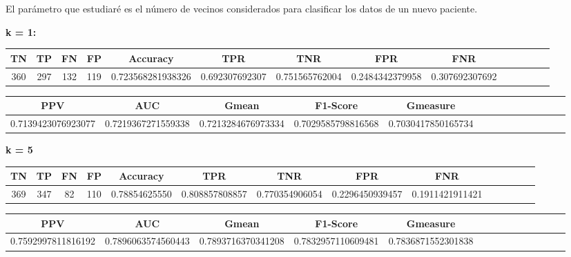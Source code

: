 \documentclass[a4]{article}
\begin{document}
El parámetro que estudiaré es el número de vecinos considerados para clasificar los datos de un nuevo paciente.

\textbf{k = 1:}
\begin{center}
\begin{tabular}{|c|c|c|c|c|c|c|c|c|c|c|c|c|c|}
\hline
\multicolumn{1}{|c|}{\textbf{TN}}& \textbf{TP} & \textbf{FN} & \textbf{FP} & \textbf{Accuracy} & \textbf{TPR} & \textbf{TNR} & \textbf{FPR} &\textbf{FNR} \\ \hline
  360 & 297 & 132 & 119 & 0.723568281938326 & 0.692307692307 & 0.751565762004 & 0.2484342379958 & 0.307692307692 \\ \hline
\end{tabular}
\end{center}

\begin{center}
\begin{tabular}{|c|c|c|c|c|c|c|c|c|c|c|c|c|c|}
\hline
\multicolumn{1}{|c|}{\textbf{PPV}} & \textbf{AUC} & \textbf{Gmean} & \textbf{F1-Score} & \textbf{Gmeasure}  \\ \hline
  0.7139423076923077 & 0.7219367271559338 & 0.7213284676973334 & 0.7029585798816568 & 0.7030417850165734
  \\ \hline
\end{tabular}
\end{center}

\textbf{k = 5}
\begin{center}
\begin{tabular}{|c|c|c|c|c|c|c|c|c|c|c|c|c|c|}
\hline
\multicolumn{1}{|c|}{\textbf{TN}}& \textbf{TP} & \textbf{FN} & \textbf{FP} & \textbf{Accuracy} & \textbf{TPR} & \textbf{TNR} & \textbf{FPR} &\textbf{FNR} \\ \hline
  369 & 347 & 82 & 110 & 0.78854625550 & 0.808857808857 & 0.770354906054 & 0.2296450939457 & 0.1911421911421 \\ \hline
\end{tabular}
\end{center}

\begin{center}
\begin{tabular}{|c|c|c|c|c|c|c|c|c|c|c|c|c|c|}
\hline
\multicolumn{1}{|c|}{\textbf{PPV}} & \textbf{AUC} & \textbf{Gmean} & \textbf{F1-Score} & \textbf{Gmeasure}  \\ \hline
  0.7592997811816192 & 0.7896063574560443 & 0.7893716370341208 & 0.7832957110609481 & 0.7836871552301838  \\ \hline
\end{tabular}
\end{center}
\end{document}
